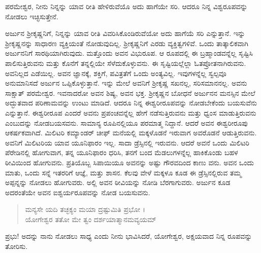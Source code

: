 {\small ಪರಮೇಶ್ವರ, ನೀನು ನಿನ್ನನ್ನು ಯಾವ ರೀತಿ ಹೇಳಿರುವೆಯೊ ಅದು ಹಾಗೆಯೇ ಸರಿ. ಆದರೂ ನಿನ್ನ ವಿಶ್ವರೂಪವನ್ನು ನೋಡಲು ಇಚ್ಛಿಸುತ್ತೇನೆ.}

ಅರ್ಜುನ ಶ್ರೀಕೃಷ್ಣನಿಗೆ, ನಿನ್ನನ್ನು ಯಾವ ರೀತಿ ವಿವರಿಸಿಕೊಂಡಿರುವೆಯೋ ಅದು ಹಾಗೆಯೆ ಸರಿ ಎನ್ನುತ್ತಾನೆ. ಇನ್ನು ಶ್ರೀಕೃಷ್ಣನನ್ನು ಸಾಧಾರಣ ವ್ಯಕ್ತಿಯಂತೆ ನೋಡುವುದಿಲ್ಲ. ಶ್ರೀಕೃಷ್ಣನಿಗೆ ಎರಡು ವ್ಯಕ್ತಿತ್ವಗಳಿವೆ. ಒಂದು ತಾತ್ಕಾಲಿಕವಾಗಿ ಅರ್ಜುನನಿಗೆ ಸಾರಥಿಯಾಗಿರುವುದು. ಮತ್ತೊಂದು ಅವನ ವಿಭುರೂಪ. ಆ ರೂಪದಲ್ಲಿ ಈ ಬ್ರಹ್ಮಾಂಡವನ್ನೆಲ್ಲ ಸೃಷ್ಟಿಸಿ ಪಾಲಿಸುತ್ತಿರುವನು ಮತ್ತು ಕೊನೆಗೆ ತನ್ನಲ್ಲಿಯೇ ಸೆಳೆದುಕೊಳ್ಳುವನು. ಈ ಸೃಷ್ಟಿಯಲ್ಲೆಲ್ಲಾ ಓತಪ್ರೋತನಾಗಿರುವನು. ಅವನಿಲ್ಲದ ಎಡೆಯಿಲ್ಲ. ಅವನ ಜ್ಞಾನಕ್ಕೆ, ಶಕ್ತಿಗೆ, ಪವಿತ್ರತೆಗೆ ಒಂದು ಅಂತ್ಯವಿಲ್ಲ. ಇವುಗಳನ್ನೆಲ್ಲ ಸ್ವಲ್ಪವೂ ಅನುಮಾನಿಸದೆ ಅರ್ಜುನ ಒಪ್ಪಿಕೊಳ್ಳುತ್ತಾನೆ. ಇನ್ನು ಮೇಲೆ ಅವನಿಗೆ ಶ್ರೀಕೃಷ್ಣ ಸಖನಲ್ಲ, ಸರಿಸಮಾನನಲ್ಲ. ಅವನು ಸಾಕ್ಷಾತ್ ಪರಮೇಶ್ವರ. ಇವನಾದರೋ ಅವನ ಶಿಷ್ಯ, ಅವನ ಭಕ್ತ. ಶ್ರೀಕೃಷ್ಣನ ಬೋಧನೆ ಅರ್ಜುನನ ಮನಸ್ಸಿನ ಮೇಲೆ ಅದ್ಭುತವಾದ ಪರಿಣಾಮವನ್ನು ಉಂಟು ಮಾಡಿದೆ. ಆದರೂ ನಿನ್ನ ಈಶ್ವರೀರೂಪವನ್ನು ನೋಡಬೇಕೆಂದು ಬಯಸುವೆನು ಎನ್ನುತ್ತಾನೆ. ಈಶ್ವರೀರೂಪ ಎಂದರೆ ಅವನು ಪ್ರಪಂಚವನ್ನೆಲ್ಲ ಹೇಗೆ ನಡೆಸುತ್ತಿರುವನು ಮತ್ತು ಧ್ವಂಸ ಮಾಡುತ್ತಿರುವನು ಎಂಬುದನ್ನು ನೋಡಬಯಸವನು. ಸಾಮಾನ್ಯ ರೂಪಿನಲ್ಲಿಯೂ ಪರಮಾತ್ಮ ನಿದ್ದಾನೆ. ಆದರೆ ಅವನ ಈಶ್ವರೀರೂಪು ಆಕರ್ಷಕವಾಗಿದೆ. ಮಿಲಿಟರಿ ಕಮ್ಯಾಂಡರ್ ಚೀಫ್ ಮನೆಯಲ್ಲಿ ಮಕ್ಕಳೊಡನೆ ಇರುವಾಗ ಅವರೊಡನೆ ಆಡುತ್ತಿರುವನು. ಅವನಿಗೆ ಮಿಲಿಟರಿಯ ಯಾವ ಯೂನಿಫಾರಂ ಇಲ್ಲ. ಸಾದಾ ಡ್ರೆಸ್ಸಿನಲ್ಲಿ ಇರುವನು. ಆದರೆ ಅವನೆ ಒಂದು ಮಿಲಿಟರಿ ಪೆರೇಡಿನಲ್ಲಿ ಹೋಗುವಾಗ, ತನ್ನ ಯೂನಿಫಾರಂ ಧರಿಸಿ, ತನಗೆ ಬಂದ ಮೆಡಲುಗಳನ್ನೆಲ್ಲ ಹಾಕಿಕೊಂಡು ಬಹಳ ಠೀವಿಯಿಂದ ಹೋಗುವನು. ಪ್ರತಿಯೊಬ್ಬ ಸಿಪಾಯಿಯೂ ಅವನನ್ನು ಅಷ್ಟು ಗೌರವದಿಂದ ಕಾಣು ವನು. ಅವನ ಒಂದು ಮಾತು, ಒಂದು ಸನ್ನೆ ಇತರರಿಗೆ ಆಜ್ಞೆ, ಮತ್ತು ಶಾಸನ. ಕೆಲವು ವೇಳೆ ಮಕ್ಕಳೂ ಕೂಡ ಈ ಡ್ರೆಸ್ಸಿನಲ್ಲಿರುವ ತಮ್ಮ ಅಪ್ಪನ್ನನ್ನು ನೋಡಲು ಹೋಗುವರು. ಅಲ್ಲಿ ಅವನ ಠೀವಿಯನ್ನು ನೋಡಿ ಬೆರಗಾಗುವರು. ಅರ್ಜುನ ಕೂಡ ಅದರಂತೆಯೇ ಅವನ ಐಶ್ವರ್ಯರೂಪವನ್ನು ನೋಡ ಬಯಸುವನು.

\begin{verse}
ಮನ್ಯಸೇ ಯದಿ ತಚ್ಛಕ್ಯಂ ಮಯಾ ದ್ರಷ್ಟುಮಿತಿ ಪ್ರಭೋ ।\\ಯೋಗೇಶ್ವರ ತತೋ ಮೇ ತ್ವಂ ದರ್ಶಯಾತ್ಮಾನಮವ್ಯಯಮ್ 
\end{verse}

{\small ಪ್ರಭು! ಅದನ್ನು ನಾನು ನೋಡಲು ಸಾಧ್ಯ ಎಂದು ನೀನು ಭಾವಿಸಿದರೆ, ಯೋಗೇಶ್ವರ, ಅಕ್ಷಯವಾದ ನಿನ್ನ ರೂಪವನ್ನು ತೋರಿಸು.}

